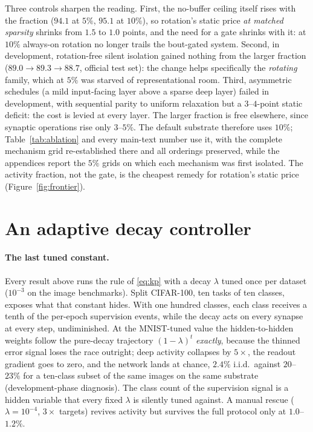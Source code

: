\documentclass{article}
\begin{document}
Three controls sharpen the reading. First, the no-buffer ceiling itself rises with the
fraction ($94.1$ at $5\%$, $95.1$ at $10\%$), so rotation's static price \emph{at matched
sparsity} shrinks from $1.5$ to $1.0$ points, and the need for a gate shrinks with it: at
$10\%$ always-on rotation no longer trails the bout-gated system. Second, in development,
rotation-free silent isolation gained nothing from the larger fraction
($89.0\to89.3\to88.7$, official test set): the change helps specifically the
\emph{rotating} family, which at $5\%$ was starved of representational room. Third,
asymmetric schedules (a mild input-facing layer above a sparse deep layer) failed in
development, with sequential parity to uniform relaxation but a $3$--$4$-point static
deficit: the cost is levied at every layer. The larger fraction is free elsewhere, since
synaptic operations rise only $3$--$5\%$. The default substrate therefore uses $10\%$;
Table~\ref{tab:ablation} and every main-text number use it, with the complete mechanism
grid re-established there and all orderings preserved, while the appendices report the
$5\%$ grids on which each mechanism was first isolated. The activity fraction, not the
gate, is the cheapest remedy for rotation's static price (Figure~\ref{fig:frontier}).

\section{An adaptive decay controller}
\label{sec:controller}

\paragraph{The last tuned constant.}
Every result above runs the rule of \eqref{eq:kp} with a decay $\lambda$ tuned once per
dataset ($10^{-3}$ on the image benchmarks). Split CIFAR-100, ten tasks of ten classes,
exposes what that constant hides. With one hundred classes, each class receives a tenth of
the per-epoch supervision events, while the decay acts on every synapse at every step,
undiminished. At the MNIST-tuned value the hidden-to-hidden weights follow the pure-decay
trajectory $(1-\lambda)^t$ \emph{exactly}, because the thinned error signal loses the race
outright; deep activity collapses by $5\times$, the readout gradient goes to zero, and the
network lands at chance, $2.4\%$ i.i.d.\ against $20$--$23\%$ for a ten-class subset of the
same images on the same substrate (development-phase diagnosis). The class count of the
supervision signal is a hidden variable that every fixed $\lambda$ is silently tuned against.
A manual rescue ($\lambda{=}10^{-4}$, $3\times$ targets) revives activity but survives the full
protocol only at $1.0$--$1.2\%$.
\end{document}
